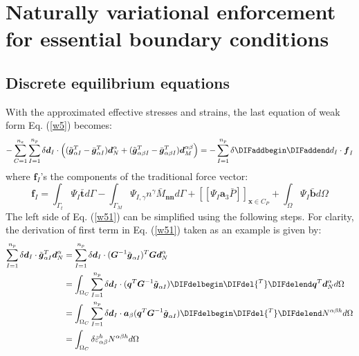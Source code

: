 \section{Naturally variational enforcement for essential boundary conditions}\label{boundary}
\subsection{Discrete equilibrium equations}
With the approximated effective stresses and strains, the last equation of weak form Eq. (\ref{w5}) becomes:
\begin{equation}\label{w51}
- \sum_{C=1}^{n_e}\sum_{I=1}^{n_p} \delta \boldsymbol d_I \cdot \left ( (\tilde{\boldsymbol g}^T_{\alpha I} - \bar{\boldsymbol g}^T_{\alpha I}) \boldsymbol d_N^{\alpha}
+ (\tilde{\boldsymbol g}^T_{\alpha\beta I} - \bar{\boldsymbol g}^T_{\alpha\beta I}) \boldsymbol d_M^{\alpha\beta} \right ) = - \sum_{I=1}^{n_p}\delta \DIFaddbegin \boldsymbol \DIFaddend d_I \cdot \boldsymbol f_I
\end{equation}
where $\boldsymbol f_I$'s \DIFdelbegin {}\DIFdelend \DIFaddbegin {}\DIFaddend the components of the traditional force vector:
\begin{equation}
        \boldsymbol f_I = \int_{\Gamma_t} \Psi_I \bar{\boldsymbol t} d\Gamma - \int_{\Gamma_M} \Psi_{I,\gamma} n^\gamma \bar M_{\boldsymbol{nn}} d\Gamma + [[\Psi_I\boldsymbol a_3 \bar P]]_{\boldsymbol x\in C_P} + \int_\Omega \Psi_I \bar{\boldsymbol b} d\Omega
\end{equation}
The left side of Eq. (\ref{w51}) can be simplified using the following steps. For clarity, the derivation of first term in Eq. (\ref{w51}) taken as an example is given by:
\begin{equation}
\begin{split}
\sum_{I=1}^{n_p} \delta \boldsymbol d_I \cdot \tilde{\boldsymbol g}^T_{\alpha I} \boldsymbol d_N^\alpha 
&= \sum_{I=1}^{n_p} \delta \boldsymbol d_I \cdot (\boldsymbol G^{-1} \tilde{\boldsymbol g}_{\alpha I})^T  \boldsymbol G \boldsymbol d^\alpha_N \\
&= \int_{\Omega_C} \sum_{I=1}^{n_p} \delta \boldsymbol d_I \cdot (\boldsymbol q^T\boldsymbol G^{-1} \tilde{\boldsymbol g}_{\alpha I})  \DIFdelbegin \DIFdel{^T  }\DIFdelend \boldsymbol q^T \boldsymbol d^\alpha_N d\Omega \\
&= \int_{\Omega_C} \sum_{I=1}^{n_p} \delta \boldsymbol d_I \cdot \boldsymbol a_\beta(\boldsymbol q^T\boldsymbol G^{-1} \tilde{\boldsymbol g}_{\alpha I})  \DIFdelbegin \DIFdel{^T  }\DIFdelend N^{\alpha\beta h} d\Omega \\
& = \int_{\Omega_C} \delta \tilde \varepsilon_{\alpha\beta}^h N^{\alpha\beta h} d\Omega 
\end{split}
\end{equation}
